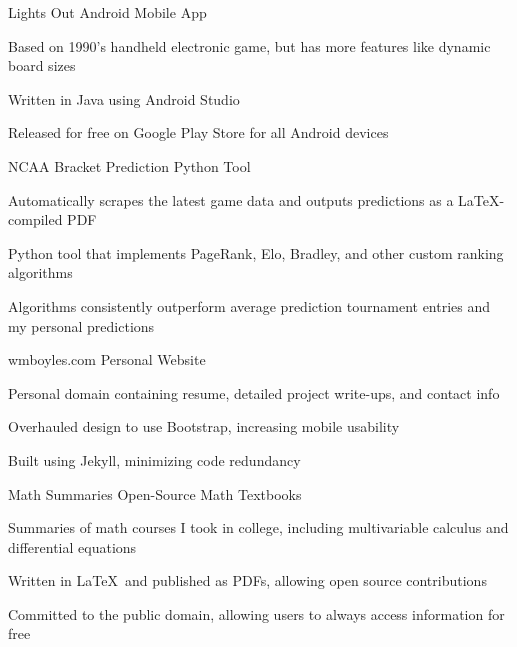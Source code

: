 \documentclass[12pt, a4paper]{awesome-cv}
\begin{document}
	\begin{cventries}
		\cvprojectentry
		{Lights Out} %
		{Android Mobile App} %
		{
			\begin{cvitems} %
				\item {Based on 1990’s handheld electronic game, but has more features like dynamic board sizes}
				\item {Written in Java using Android Studio}
				\item {Released for free on Google Play Store for all Android devices}
			\end{cvitems}
		}
	
		\cvprojectentry
		{NCAA Bracket Prediction} %
		{Python Tool} %
		{
			\begin{cvitems} %
				\item {Automatically scrapes the latest game data and outputs predictions as a \LaTeX-compiled PDF}
				\item {Python tool that implements PageRank, Elo, Bradley, and other custom ranking algorithms}
				\item {Algorithms consistently outperform average prediction tournament entries and my personal predictions}
			\end{cvitems}
		}
	
		\cvprojectentry
		{wmboyles.com} %
		{Personal Website} %
		{
			\begin{cvitems} %
				\item {Personal domain containing resume, detailed project write-ups, and contact info}
				\item {Overhauled design to use Bootstrap, increasing mobile usability}
				\item {Built using Jekyll, minimizing code redundancy}
			\end{cvitems}
		}
	
		\cvprojectentry
		{Math Summaries} %
		{Open-Source Math Textbooks} %
		{
			\begin{cvitems} %
				\item {Summaries of math courses I took in college, including multivariable calculus and differential equations}
				\item {Written in \LaTeX ~and published as PDFs, allowing open source contributions}
				\item {Committed to the public domain, allowing users to always access information for free}
			\end{cvitems}
		}
	\end{cventries}
	
	
\end{document}
